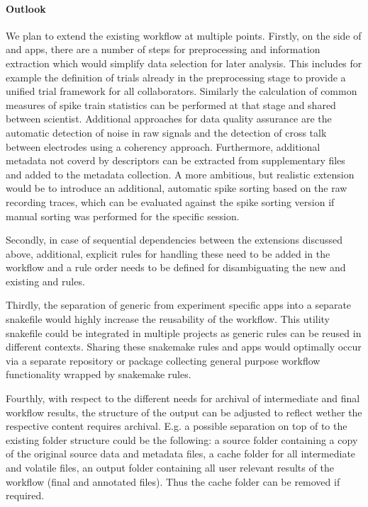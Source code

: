\paragraph{Outlook}
We plan to extend the existing workflow at multiple points. Firstly, on the side of  and  apps, there are a number of  steps for preprocessing and information extraction which would simplify data selection for later analysis. This includes for example the definition of trials already in the preprocessing stage to provide a unified trial framework for all collaborators. Similarly the calculation of common measures of spike train statistics can be performed at that stage and shared between scientist. Additional approaches for data quality assurance are the automatic detection of noise in raw signals and the detection of cross talk between electrodes using a coherency approach. Furthermore, additional metadata not coverd by descriptors can be extracted from supplementary files and added to the metadata collection. A more ambitious, but realistic extension would be to introduce an additional, automatic spike sorting based on the raw recording traces, which can be evaluated against the spike sorting version if manual sorting was performed for the specific session. 

Secondly, in case of sequential dependencies between the extensions discussed above, additional, explicit rules for handling these need to be added in the workflow and a rule order needs to be defined for disambiguating the new and existing  and  rules.

Thirdly, the separation of generic from experiment specific apps into a separate snakefile would highly increase the reusability of the workflow. This utility snakefile could be integrated in multiple projects as generic rules can be reused in different contexts. Sharing these snakemake rules and apps would optimally occur via a separate repository or package collecting general purpose workflow functionality wrapped by snakemake rules.

Fourthly, with respect to the different needs for archival of intermediate and final workflow results, the structure of the output can be adjusted to reflect wether the respective content requires archival. E.g. a possible separation on top of to the existing folder structure could be the following: a source folder containing a copy of the original source data and metadata files, a cache folder for all intermediate and volatile files, an output folder containing all user relevant results of the workflow (final  and annotated  files). Thus the cache folder can be removed if required.

